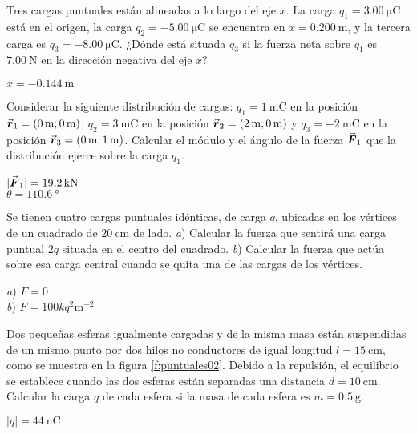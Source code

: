 %
\begin{Exercise}
  Tres cargas puntuales están alineadas a lo largo del eje $x$. La carga $q_1 = \SI{3.00}{\micro\coulomb}$ está en el origen, la carga $q_2 = \SI{-5.00}{\micro\coulomb}$ se encuentra en $x = \SI{0.200}{\metre}$, y la tercera carga es $q_3 = \SI{-8.00}{\micro\coulomb}$. ¿Dónde está situada $q_3$ si la fuerza neta sobre $q_1$ es $\SI{7.00}{\newton}$ en la dirección negativa del eje $x$?
\end{Exercise}
\begin{Answer}
  $x = \SI{-0.144}{\metre}$
\end{Answer}
%
\begin{Exercise}
  Considerar la siguiente distribución de cargas: $q_1 = \SI{1}{\milli\coulomb}$ en la posición $\va*{r}_1 = (\SI{0}{\metre};\SI{0}{\metre})$; $q_2 = \SI{3}{\milli\coulomb}$ en la posición $\va*{r}_2 = (\SI{2}{\metre};\SI{0}{\metre})$ y $q_3 = \SI{-2}{\milli\coulomb}$ en la posición $\va*{r}_3 = (\SI{0}{\metre};\SI{1}{\metre})$. Calcular el módulo y el ángulo de la fuerza $\va*{F}_1$ que la distribución ejerce sobre la carga $q_1$.
\end{Exercise}
\begin{Answer}
  \begin{minipage}[t]{.5\textwidth}
    $|\va*{F}_1| = \SI{19.2}{\kilo\newton}$\\ $\theta = \SI{110.6}{\degree}$
  \end{minipage}
\end{Answer}
%
\begin{Exercise}
  Se tienen cuatro cargas puntuales idénticas, de carga $q$, ubicadas en los vértices de un cuadrado de $\SI{20}{\centi\metre}$ de lado. \textit{a}) Calcular la fuerza que sentirá una carga puntual $2q$ situada en el centro del cuadrado. \textit{b}) Calcular la fuerza que actúa sobre esa carga central cuando se quita una de las cargas de los vértices.
\end{Exercise}
\begin{Answer}
  \begin{minipage}[t]{.5\textwidth}
    \textit{a}) $F = 0$\\ \textit{b}) $F = 100kq^2\si{\metre^{-2}}$
  \end{minipage}
\end{Answer}
%
\begin{minipage}[t]{.6\textwidth}
\begin{Exercise}\label{p:puntuales02}
  Dos pequeñas esferas igualmente cargadas y de la misma masa están suspendidas de un mismo punto por dos hilos no conductores de igual longitud $l = \SI{15}{\centi\metre}$, como se muestra en la figura \ref{f:puntuales02}. Debido a la repulsión, el equilibrio se establece cuando las dos esferas están separadas una distancia $d = \SI{10}{\centi\metre}$. Calcular la carga $q$ de cada esfera si la masa de cada esfera es $m = \SI{0.5}{\gram}$.
\end{Exercise}
\begin{Answer}
  $|q| = \SI{44}{\nano\coulomb}$
\end{Answer}
\end{minipage}
